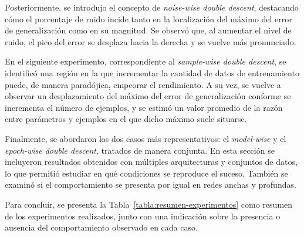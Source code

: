 Posteriormente, se introdujo el concepto de \textit{noise-wise double descent}, destacando cómo el porcentaje de ruido incide tanto en la localización del máximo del error de generalización como en su magnitud. Se observó que, al aumentar el nivel de ruido, el pico del error se desplaza hacia la derecha y se vuelve más pronunciado.\newline

En el siguiente experimento, correspondiente al \textit{sample-wise double descent}, se identificó una región en la que incrementar la cantidad de datos de entrenamiento puede, de manera paradójica, empeorar el rendimiento. A su vez, se vuelve a observar un desplazamiento del máximo del error de generalización conforme se incrementa el número de ejemplos, y se estimó un valor promedio de la razón entre parámetros y ejemplos en el que dicho máximo suele situarse.\newline

Finalmente, se abordaron los dos casos más representativos: el \textit{model-wise} y el \textit{epoch-wise double descent}, tratados de manera conjunta. En esta sección se incluyeron resultados obtenidos con múltiples arquitecturas y conjuntos de datos, lo que permitió estudiar en qué condiciones se reproduce el suceso. También se examinó si el comportamiento se presenta por igual en redes anchas y profundas.\newline

Para concluir, se presenta la Tabla~\ref{tabla:resumen-experimentos} como resumen de los experimentos realizados, junto con una indicación sobre la presencia o ausencia del comportamiento observado en cada caso.\newline


